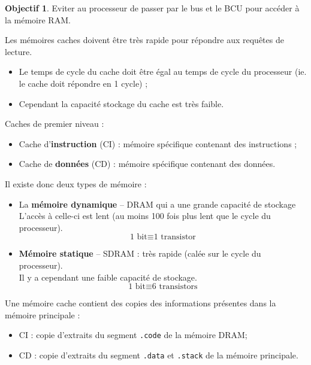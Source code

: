 \documentclass[11pt,english,french]{scrreprt}
\theoremstyle{remark}
\theoremstyle{definition}
\newtheorem*{obj*}{Objectif}
\begin{document}
\begin{obj*}
	Eviter au processeur de passer par le bus et le BCU pour accéder à la mémoire RAM.

	Les mémoires caches doivent être très rapide pour répondre aux requêtes de lecture.
	\begin{itemize}
		\item Le temps de cycle du cache doit être égal au temps de cycle du processeur (ie. le cache doit répondre en 1 cycle) ;
		\item Cependant la capacité stockage du cache est très faible.
	\end{itemize}
\end{obj*}

Caches de premier niveau :\begin{itemize}
	\item Cache d'\textbf{instruction} (CI) : mémoire spécifique contenant des instructions ;
	\item Cache de \textbf{données} (CD) : mémoire spécifique contenant des données.
\end{itemize}

\vspace{10pt}

Il existe donc deux types de mémoire :\begin{itemize}
	\item La \textbf{mémoire dynamique} -- DRAM qui a une grande capacité de stockage\\
	L'accès à celle-ci est lent (au moins 100 fois plus lent que le cycle du processeur).
	\[
		\textrm{1 bit} \equiv \textrm{1 transistor}
	\]
	\item \textbf{Mémoire statique} -- SDRAM : très rapide (calée sur le cycle du processeur).\\
	Il y a cependant une faible capacité de stockage.
	\[
		\textrm{1 bit}\equiv\textrm{6 transistors}
	\]
\end{itemize}

\vspace{10pt}

Une mémoire cache contient des copies des informations présentes dans la mémoire principale :\begin{itemize}
	\item CI : copie d'extraits du segment \lstinline!.code! de la mémoire DRAM;
	\item CD : copie d'extraits du segment \lstinline!.data! et \lstinline!.stack! de la mémoire principale.
\end{itemize}
\end{document}
